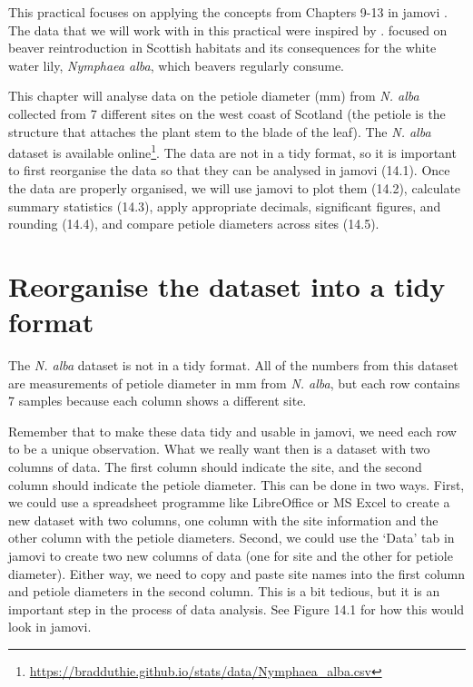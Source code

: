 \documentclass[
  openany]{scrbook}
\begin{document}
This practical focuses on applying the concepts from Chapters 9-13 in jamovi \citep{Jamovi2022}.
The data that we will work with in this practical were inspired by \citet{Law2014}.
\citet{Law2014} focused on beaver reintroduction in Scottish habitats and its consequences for the white water lily, \emph{Nymphaea alba}, which beavers regularly consume.

This chapter will analyse data on the petiole diameter (mm) from \emph{N. alba} collected from 7 different sites on the west coast of Scotland (the petiole is the structure that attaches the plant stem to the blade of the leaf).
The \emph{N. alba} dataset is available online\footnote{\url{https://bradduthie.github.io/stats/data/Nymphaea_alba.csv}}.
The data are not in a tidy format, so it is important to first reorganise the data so that they can be analysed in jamovi (14.1).
Once the data are properly organised, we will use jamovi to plot them (14.2), calculate summary statistics (14.3), apply appropriate decimals, significant figures, and rounding (14.4), and compare petiole diameters across sites (14.5).

\hypertarget{reorganise-the-dataset-into-a-tidy-format}{%
\section{Reorganise the dataset into a tidy format}\label{reorganise-the-dataset-into-a-tidy-format}}

The \emph{N. alba} dataset is not in a tidy format.
All of the numbers from this dataset are measurements of petiole diameter in mm from \emph{N. alba}, but each row contains 7 samples because each column shows a different site.

Remember that to make these data tidy and usable in jamovi, we need each row to be a unique observation.
What we really want then is a dataset with two columns of data.
The first column should indicate the site, and the second column should indicate the petiole diameter.
This can be done in two ways.
First, we could use a spreadsheet programme like LibreOffice or MS Excel to create a new dataset with two columns, one column with the site information and the other column with the petiole diameters.
Second, we could use the `Data' tab in jamovi to create two new columns of data (one for site and the other for petiole diameter).
Either way, we need to copy and paste site names into the first column and petiole diameters in the second column.
This is a bit tedious, but it is an important step in the process of data analysis.
See Figure 14.1 for how this would look in jamovi.
\end{document}
